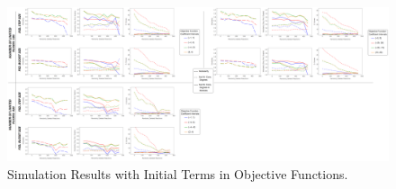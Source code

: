\begin{landscape}
	\begin{figure}[ht]
		\centering
		\vspace*{1.5cm}
		\hspace*{-1.2cm}
		\includegraphics[width=1.6\textwidth]{../images/results-obj_func_terms_initial-simulation-results.png}
		\caption{Simulation Results with Initial Terms in Objective Functions.}
		\label{figure-supplements-obj_func-terms-initial}
	\end{figure}
\end{landscape}